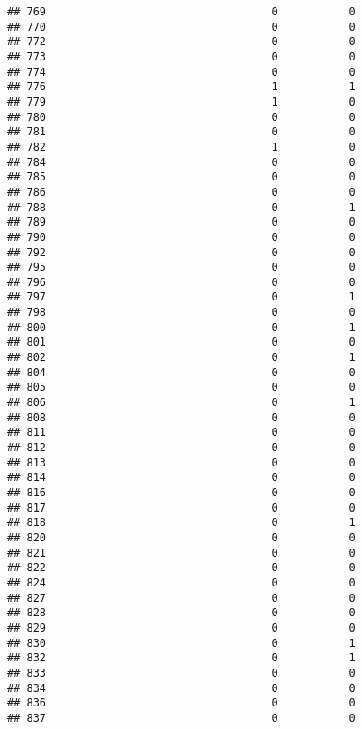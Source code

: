 \documentclass[
]{article}
\begin{document}
\begin{verbatim}
## 769                                   0           0
## 770                                   0           0
## 772                                   0           0
## 773                                   0           0
## 774                                   0           0
## 776                                   1           1
## 779                                   1           0
## 780                                   0           0
## 781                                   0           0
## 782                                   1           0
## 784                                   0           0
## 785                                   0           0
## 786                                   0           0
## 788                                   0           1
## 789                                   0           0
## 790                                   0           0
## 792                                   0           0
## 795                                   0           0
## 796                                   0           0
## 797                                   0           1
## 798                                   0           0
## 800                                   0           1
## 801                                   0           0
## 802                                   0           1
## 804                                   0           0
## 805                                   0           0
## 806                                   0           1
## 808                                   0           0
## 811                                   0           0
## 812                                   0           0
## 813                                   0           0
## 814                                   0           0
## 816                                   0           0
## 817                                   0           0
## 818                                   0           1
## 820                                   0           0
## 821                                   0           0
## 822                                   0           0
## 824                                   0           0
## 827                                   0           0
## 828                                   0           0
## 829                                   0           0
## 830                                   0           1
## 832                                   0           1
## 833                                   0           0
## 834                                   0           0
## 836                                   0           0
## 837                                   0           0

\end{verbatim}
\end{document}
